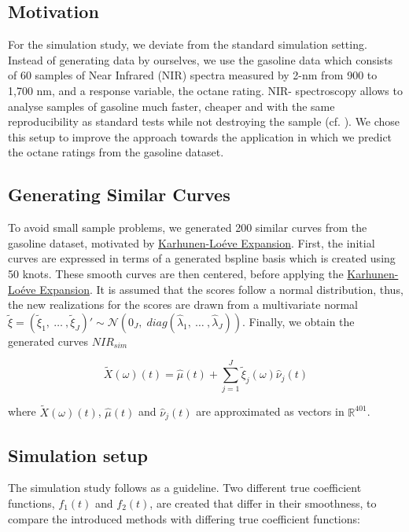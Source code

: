 \documentclass[11pt,twoside,a4paper]{article}
\begin{document}
	\subsection{Motivation}
	For the simulation study, we deviate from the standard simulation setting. Instead of generating data by ourselves, we use the gasoline data which consists of 60 samples of Near Infrared (NIR) spectra measured by 2-nm from 900 to 1,700 nm, and a response variable,  the octane rating. NIR- spectroscopy allows to analyse samples of gasoline much faster, cheaper and with the same reproducibility as standard tests while not destroying the sample (cf. \cite{Bohacs_Ovadi_Salgo1998}). We chose this setup to improve the approach towards the application in which we  predict the octane ratings from the gasoline dataset.
	
	\subsection{Generating Similar Curves}
	To avoid small sample problems, we generated 200 similar curves from the gasoline dataset, motivated by \hyperlink{KL}{Karhunen-Lo\'{e}ve Expansion}. First, the initial curves are expressed in terms of a generated bspline basis which is created using 50 knots. These smooth curves are then centered, before applying the \hyperlink{KL}{Karhunen-Lo\'{e}ve Expansion}. It is assumed that the scores follow a normal distribution, thus, the new realizations for the scores are drawn from a multivariate normal $\tilde{\xi} = \left(\tilde{\xi}_{1},\: \dots \:, \tilde{\xi}_{J}\right)' \sim \mathcal{N}(0_J, \; diag(\hat{\lambda}_1,\: \dots\:, \hat{\lambda}_J))$. Finally, we obtain the generated curves $NIR_{sim}$
	
	
		$$\tilde{X}(\omega)(t) = \hat{\mu}(t) + \sum_{j = 1}^{J} \tilde{\xi}_j(\omega) \hat{\nu}_j(t)$$ 

		where
			$\tilde{X}(\omega)(t)$, $\hat{\mu}(t)$ and $\hat{\nu}_j(t)$ are approximated as vectors in $\mathbb{R}^{401}$.
		
	
    
    \subsection{Simulation setup}
	The simulation study follows \cite{Reiss_2007b} as a guideline. Two different true coefficient functions,  $f_1(t)$ and  $f_2(t)$, are created that differ in their smoothness, to compare the introduced methods with differing true coefficient functions:
	
\end{document}
